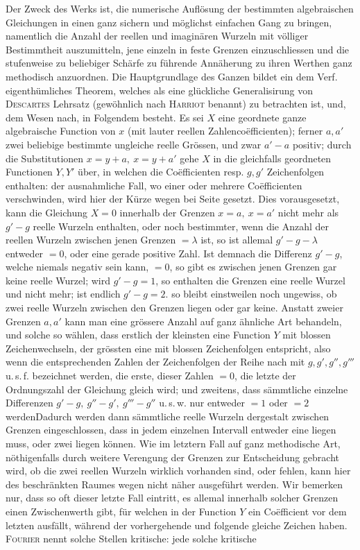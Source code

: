 Der Zweck des Werks ist, die numerische Auflösung der bestimmten algebraischen Gleichungen in einen ganz sichern und möglichst einfachen Gang zu bringen, namentlich die Anzahl der reellen und imaginären Wurzeln mit völliger Bestimmtheit auszumitteln, jene einzeln in feste Grenzen einzuschliessen und die stufenweise zu beliebiger Schärfe zu führende Annäherung zu ihren Werthen ganz methodisch anzuordnen. Die Hauptgrundlage des Ganzen bildet ein dem Verf.
eigenthümliches Theorem, welches als eine glückliche Generalisirung von \textsc{Descartes} Lehrsatz (gewöhnlich nach \textsc{Harriot} benannt) zu betrachten ist, und, dem Wesen nach, in Folgendem besteht. Es sei $X$ eine geordnete ganze algebraische Function von $x$ (mit lauter reellen Zahlencoëfficienten); ferner $a,a'$ zwei beliebige bestimmte ungleiche reelle Grössen, und zwar $a'-a$ positiv; durch die Substitutionen $x=y+a,\ x=y+a'$ gehe $X$ in die gleichfalls geordneten Functionen $Y,Y'$ über, in welchen die Coëfficienten resp. $g,g'$ Zeichenfolgen enthalten: der ausnahmliche Fall, wo einer oder mehrere Coëfficienten verschwinden, wird hier der Kürze wegen bei Seite gesetzt. Dies vorausgesetzt, kann die Gleichung $X=0$ innerhalb der Grenzen $x=a,\ x=a'$ nicht mehr als $g'-g$ reelle Wurzeln enthalten, oder noch bestimmter, wenn die Anzahl der reellen Wurzeln zwischen jenen Grenzen $=\lambda$ ist, so ist allemal $g'-g-\lambda$ entweder $=0$, oder eine gerade positive Zahl. Ist demnach die Differenz $g'-g$, welche niemals negativ sein kann, $=0$, so gibt es zwischen jenen Grenzen gar keine reelle Wurzel; wird $g'-g=1$, so enthalten die Grenzen eine reelle Wurzel und nicht mehr; ist endlich $g'-g=2$. so bleibt einstweilen noch ungewiss, ob zwei reelle Wurzeln zwischen den Grenzen liegen oder gar keine. Anstatt zweier Grenzen $a,a'$ kann man eine grössere Anzahl auf ganz ähnliche Art behandeln, und solche so wählen, dass erstlich der kleinsten eine Function $Y$ mit blossen Zeichenwechseln, der grössten eine mit blossen Zeichenfolgen entspricht, also wenn die entsprechenden Zahlen der Zeichenfolgen der Reihe nach mit $g,g',g'',g'''$ u.\,s.\,f. bezeichnet werden, die erste, dieser Zahlen $=0$, die letzte der Ordnungszahl der Gleichung gleich wird; und zweitens, dass sämmtliche einzelne Differenzen $g'-g,\ g''-g',\ g'''-g''$ u.\,s.\,w. nur entweder $=1$ oder $=2$ werden\quad Dadurch werden dann sämmtliche reelle Wurzeln dergestalt zwischen Grenzen eingeschlossen, dass in jedem einzelnen Intervall entweder eine liegen muss, oder zwei liegen können. Wie im letztern Fall auf ganz methodische Art, nöthigenfalls durch weitere Verengung der Grenzen zur Entscheidung gebracht wird, ob die zwei reellen Wurzeln wirklich vorhanden sind, oder fehlen, kann hier des beschränkten Raumes wegen nicht näher ausgeführt werden. Wir bemerken nur, dass so oft dieser letzte Fall eintritt, es allemal innerhalb solcher Grenzen einen Zwischenwerth gibt, für welchen in der Function $Y$ ein Coëfficient vor dem letzten ausfällt, während der vorhergehende und folgende gleiche Zeichen haben. \textsc{Fourier} nennt solche Stellen kritische: jede solche kritische
